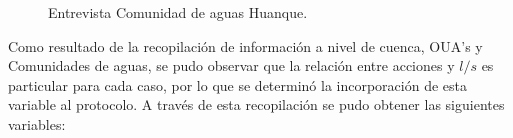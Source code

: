 \documentclass[]{article}
\begin{document}
\begin{figure} [H]
	\caption{Entrevista Comunidad de aguas Huanque.}
\end{figure}
\clearpage
Como resultado de la recopilación de información a nivel de cuenca, OUA's y Comunidades de aguas, se pudo observar que la relación entre acciones y $l/s$ es particular para cada caso, por lo que se determinó la incorporación de esta variable al protocolo. A través de esta recopilación se pudo obtener las siguientes variables:
\end{document}
